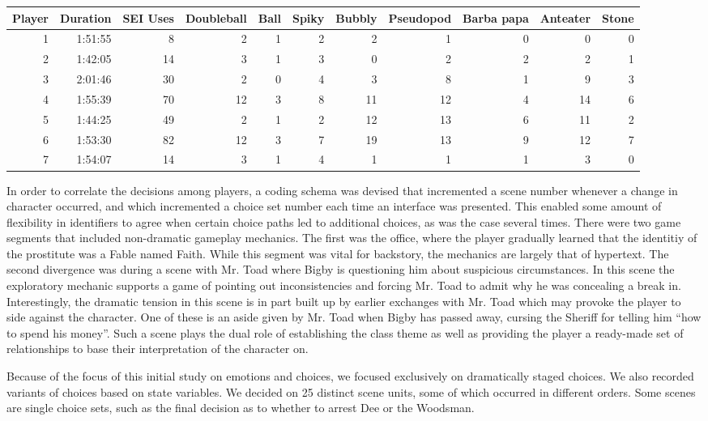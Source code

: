 \begin{center}
\begin{tabular}{rrrrrrrrrrr}
Player & Duration & SEI Uses & Doubleball & Ball & Spiky & Bubbly & Pseudopod & Barba papa & Anteater & Stone\\
\hline
1 & 1:51:55 & 8 & 2 & 1 & 2 & 2 & 1 & 0 & 0 & 0\\
2 & 1:42:05 & 14 & 3 & 1 & 3 & 0 & 2 & 2 & 2 & 1\\
3 & 2:01:46 & 30 & 2 & 0 & 4 & 3 & 8 & 1 & 9 & 3\\
4 & 1:55:39 & 70 & 12 & 3 & 8 & 11 & 12 & 4 & 14 & 6\\
5 & 1:44:25 & 49 & 2 & 1 & 2 & 12 & 13 & 6 & 11 & 2\\
6 & 1:53:30 & 82 & 12 & 3 & 7 & 19 & 13 & 9 & 12 & 7\\
7 & 1:54:07 & 14 & 3 & 1 & 4 & 1 & 1 & 1 & 3 & 0\\
\end{tabular}
\end{center}
In order to correlate the decisions among players, a coding schema was
devised that incremented a scene number whenever a change in character
occurred, and which incremented a choice set number each time an
interface was presented. This enabled some amount of flexibility in
identifiers to agree when certain choice paths led to additional
choices, as was the case several times. There were two game segments
that included non-dramatic gameplay mechanics. The first was the
office, where the player gradually learned that the identitiy of the
prostitute was a Fable named Faith. While this segment was vital for
backstory, the mechanics are largely that of hypertext. The second
divergence was during a scene with Mr. Toad where Bigby is questioning
him about suspicious circumstances. In this scene the exploratory
mechanic supports a game of pointing out inconsistencies and forcing
Mr. Toad to admit why he was concealing a break in. Interestingly, the
dramatic tension in this scene is in part built up by earlier
exchanges with Mr. Toad which may provoke the player to side against
the character. One of these is an aside given by Mr. Toad when Bigby
has passed away, cursing the Sheriff for telling him “how to spend his
money”. Such a scene plays the dual role of establishing the class
theme as well as providing the player a ready-made set of
relationships to base their interpretation of the character on.

Because of the focus of this initial study on emotions and choices, we
focused exclusively on dramatically staged choices. We also recorded
variants of choices based on state variables. We decided on 25
distinct scene units, some of which occurred in different orders. Some
scenes are single choice sets, such as the final decision as to
whether to arrest Dee or the Woodsman.


